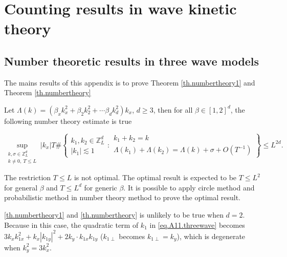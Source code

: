 \chapter{Counting results in wave kinetic theory}\label{chapter.numbertheory}


\section{Number theoretic results in three wave models}\label{sec.numbertheoryA}
The mains results of this appendix is to prove Theorem \ref{th.numbertheory1} and Theorem \ref{th.numbertheory} 

\begin{thm}\label{th.numbertheory1}
Let $\Lambda(k)=(\beta_x k_x^2+\beta_2 k_2^2+\cdots\beta_d k_d^2)k_x$, $d\ge 3$, then for all $\beta\in [1,2]^d$, the following number theory estimate is true

\begin{equation}\label{eq.numbertheory1.threewave}
    \sup_{\substack{k,\sigma\in\mathbb{Z}_L^d\\k\ne 0,\ T\le L}} |k_x|T\#\left
    \{\begin{matrix}
k_1,k_2\in\mathbb{Z}_L^d \\
|k_1|\lesssim 1
\end{matrix}
:
\begin{matrix}
k_1+k_2=k \\
\Lambda(k_1)+\Lambda(k_2)=\Lambda(k)+\sigma+O(T^{-1})
\end{matrix}
\right\}\le L^{2d}.
\end{equation}


\end{thm}

\begin{rem}
The restriction $T\le L$ is not optimal. The optimal result is expected to be $T\le L^2$ for general $\beta$ and $T\le L^{d}$ for generic $\beta$. It is possible to apply circle method and probabilistic method in number theory method to prove the optimal result.
\end{rem}

\begin{rem}\label{rem.nottrue2d}
\ref{th.numbertheory1} and \ref{th.numbertheory} is unlikely to be true when $d=2$. Because in this case, the quadratic term of $k_1$ in \eqref{eq.A11.threewave} becomes $3k_xk_{1x}^2+k_x|k_{1y}|^2+2k_{y}\cdot k_{1x} k_{1y}$ ($k_{1\perp}$ becomes $k_{1\perp}=k_y$), which is degenerate when $k_{y}^2=3k_x^2$. 
\end{rem}

